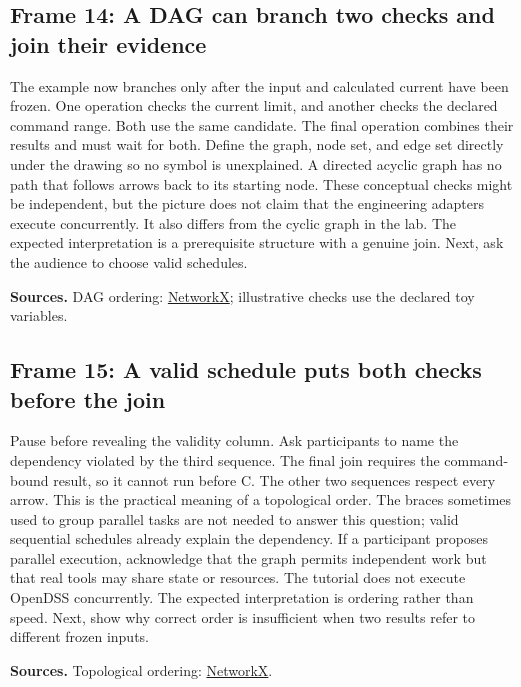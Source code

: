 \documentclass[11pt]{article}
\begin{document}
\subsection*{Frame 14: A DAG can branch two checks and join their evidence}
The example now branches only after the input and calculated current have been frozen. One operation checks the current limit, and another checks the declared command range. Both use the same candidate. The final operation combines their results and must wait for both. Define the graph, node set, and edge set directly under the drawing so no symbol is unexplained. A directed acyclic graph has no path that follows arrows back to its starting node. These conceptual checks might be independent, but the picture does not claim that the engineering adapters execute concurrently. It also differs from the cyclic graph in the lab. The expected interpretation is a prerequisite structure with a genuine join. Next, ask the audience to choose valid schedules.\par
\par\nopagebreak\begin{minipage}{\linewidth}{\footnotesize\color{slate}\textbf{Sources.} DAG ordering: \href{https://networkx.org/documentation/stable/reference/algorithms/generated/networkx.algorithms.dag.topological_sort.html}{NetworkX}; illustrative checks use the declared toy variables.\par}\end{minipage}\par\medskip
\subsection*{Frame 15: A valid schedule puts both checks before the join}
Pause before revealing the validity column. Ask participants to name the dependency violated by the third sequence. The final join requires the command-bound result, so it cannot run before C. The other two sequences respect every arrow. This is the practical meaning of a topological order. The braces sometimes used to group parallel tasks are not needed to answer this question; valid sequential schedules already explain the dependency. If a participant proposes parallel execution, acknowledge that the graph permits independent work but that real tools may share state or resources. The tutorial does not execute OpenDSS concurrently. The expected interpretation is ordering rather than speed. Next, show why correct order is insufficient when two results refer to different frozen inputs.\par
\par\nopagebreak\begin{minipage}{\linewidth}{\footnotesize\color{slate}\textbf{Sources.} Topological ordering: \href{https://networkx.org/documentation/stable/reference/algorithms/generated/networkx.algorithms.dag.topological_sort.html}{NetworkX}.\par}\end{minipage}\par\medskip
\end{document}

